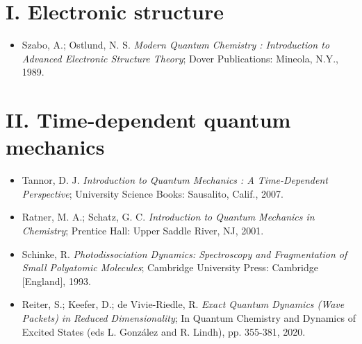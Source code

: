 \section*{I. Electronic structure}
\begin{itemize}

\item Szabo, A.; Ostlund, N. S. \textit{Modern Quantum Chemistry : Introduction to Advanced Electronic Structure Theory}; Dover Publications: Mineola, N.Y., 1989.

\end{itemize}

\section*{II. Time-dependent quantum mechanics}
\begin{itemize}

\item Tannor, D. J. \textit{Introduction to Quantum Mechanics : A Time-Dependent Perspective}; University Science Books: Sausalito, Calif., 2007.

\item Ratner, M. A.; Schatz, G. C. \textit{Introduction to Quantum Mechanics in Chemistry}; Prentice Hall: Upper Saddle River, NJ, 2001.

\item Schinke, R. \textit{Photodissociation Dynamics: Spectroscopy and Fragmentation of Small Polyatomic Molecules}; Cambridge University Press: Cambridge [England], 1993.

\item Reiter, S.; Keefer, D.; de Vivie-Riedle, R. \textit{Exact Quantum Dynamics (Wave Packets) in Reduced Dimensionality}; In Quantum Chemistry and Dynamics of Excited States (eds L. González and R. Lindh), pp. 355-381, 2020.

\end{itemize}



